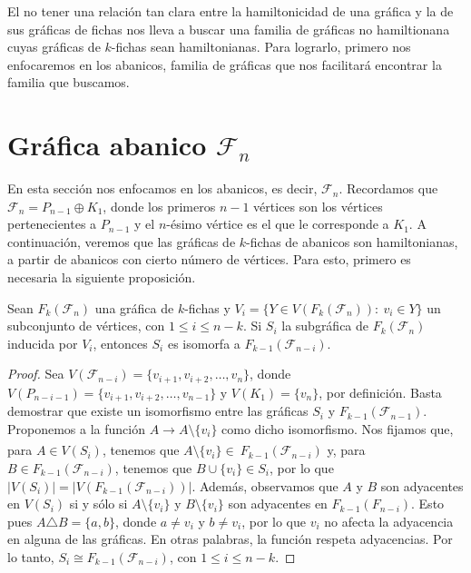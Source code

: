 El no tener una relaci\'on tan clara entre la hamiltonicidad de una gr\'afica y
la de sus gr\'aficas de fichas nos lleva a buscar una familia de gr\'aficas no
hamiltionana cuyas gr\'aficas de $k$-fichas sean hamiltonianas. Para lograrlo,
primero nos enfocaremos en los abanicos, familia de gr\'aficas que nos
facilitar\'a encontrar la familia que buscamos.

\section{Gr\'afica abanico \texorpdfstring{$\mathcal{F}_n$}{Fn}}%
\label{sec:SimpleFan}

En esta secci\'on nos enfocamos en los abanicos, es decir, $\mathcal{F}_n$.
Recordamos que $\mathcal{F}_n = P_{n-1} \oplus K_1$, donde los primeros $n-1$
v\'ertices son los v\'ertices pertenecientes a $P_{n-1}$ y el $n$-\'esimo
v\'ertice es el que le corresponde a $K_1$. A continuaci\'on, veremos que las
gr\'aficas de $k$-fichas de abanicos son hamiltonianas, a partir de abanicos con
cierto n\'umero de v\'ertices. Para esto, primero es necesaria la siguiente
proposici\'on.

\begin{proposicion}
\label{prop:iso-SFan}
    Sean $F_k(\mathcal{F}_n)$ una gr\'afica de $k$-fichas y $V_i=\{ Y \in
    V(F_k(\mathcal{F}_n)) \colon\ v_i \in Y \}$ un subconjunto de v\'ertices,
    con $1 \leq i \leq n-k$. Si $S_i$ la subgr\'afica de $F_k(\mathcal{F}_n)$
    inducida  por $V_i$, entonces $S_i$ es isomorfa a
    $F_{k-1}(\mathcal{F}_{n-i})$.
\end{proposicion}
    
\begin{proof}
    Sea $V(\mathcal{F}_{n-i}) = \{v_{i+1}, v_{i+2}, \dots, v_n\}$, donde
    $V(P_{n-i-1}) = \{v_{i+1}, v_{i+2}, \dots, v_{n-1}\}$ y $V(K_1)= \{v_n\}$,
    por definici\'on. Basta demostrar que existe un isomorfismo entre las
    gr\'aficas $S_i$ y $F_{k-1}(\mathcal{F}_{n-1})$. Proponemos a la funci\'on
    $A \xrightarrow[]{} A \setminus \{v_i\}$ como dicho isomorfismo. Nos fijamos
    que, para $A \in V(S_i)$, tenemos que $A \setminus \{v_i\} \in \
    F_{k-1}(\mathcal{F}_{n-i})$ y, para $B \in F_{k-1}(\mathcal{F}_{n-i})$,
    tenemos que $B \cup \{v_i\} \in S_i$, por lo que
    $|V(S_i)|=|V(F_{k-1}(\mathcal{F}_{n-i}))|$. Adem\'as, observamos que $A$ y
    $B $ son adyacentes en $V(S_i)$ si y s\'olo si $A \setminus \{v_i\}$ y $B
    \setminus \{v_i\}$ son adyacentes en $F_{k-1}(F_{n-i})$. Esto pues
    $A\triangle B = \{a,b\}$, donde $a\neq v_i$ y $b \neq v_i$, por lo que $v_i$
    no afecta la adyacencia en alguna de las gr\'aficas. En otras palabras, la
    funci\'on respeta adyacencias. Por lo tanto, $S_i \cong
    F_{k-1}(\mathcal{F}_{n-i})$, con $1 \leq i \leq n-k$.
\end{proof}

